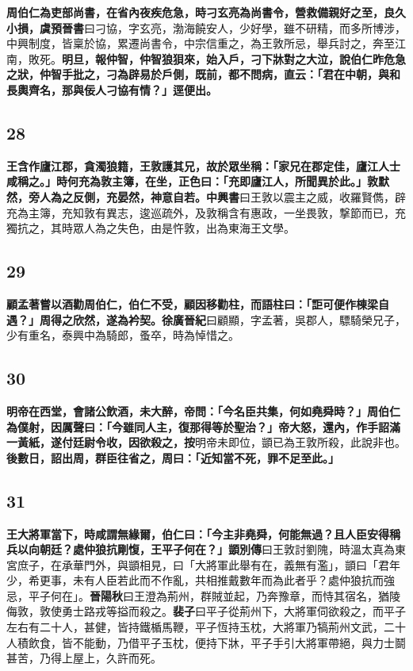 \textbf{周伯仁為吏部尚書，在省內夜疾危急，時刁玄亮為尚書令，營救備親好之至，良久小損，}{\footnotesize \textbf{虞預晉書}曰刁協，字玄亮，渤海饒安人，少好學，雖不研精，而多所博涉，中興制度，皆稟於協，累遷尚書令，中宗信重之，為王敦所忌，舉兵討之，奔至江南，敗死。}\textbf{明旦，報仲智，仲智狼狽來，始入戶，刁下牀對之大泣，說伯仁昨危急之狀，仲智手批之，刁為辟易於戶側，既前，都不問病，直云：「君在中朝，與和長輿齊名，那與佞人刁協有情？」逕便出。}

\subsection*{28}

\textbf{王含作廬江郡，貪濁狼籍，王敦護其兄，故於眾坐稱：「家兄在郡定佳，廬江人士咸稱之。」時何充為敦主簿，在坐，正色曰：「充即廬江人，所聞異於此。」敦默然，旁人為之反側，充晏然，神意自若。}{\footnotesize \textbf{中興書}曰王敦以震主之威，收羅賢儁，辟充為主簿，充知敦有異志，逡巡疏外，及敦稱含有惠政，一坐畏敦，撃節而已，充獨抗之，其時眾人為之失色，由是忤敦，出為東海王文學。}

\subsection*{29}

\textbf{顧孟著嘗以酒勸周伯仁，伯仁不受，顧因移勸柱，而語柱曰：「詎可便作棟梁自遇？」周得之欣然，遂為衿契。}{\footnotesize \textbf{徐廣晉紀}曰顧顯，字孟著，吳郡人，驃騎榮兄子，少有重名，泰興中為騎郎，蚤卒，時為悼惜之。}

\subsection*{30}

\textbf{明帝在西堂，會諸公飲酒，未大醉，帝問：「今名臣共集，何如堯舜時？」周伯仁為僕射，因厲聲曰：「今雖同人主，復那得等於聖治？」帝大怒，還內，作手詔滿一黃紙，遂付廷尉令收，因欲殺之，}{\footnotesize \textbf{按}明帝未即位，顗已為王敦所殺，此說非也。}\textbf{後數日，詔出周，群臣往省之，周曰：「近知當不死，罪不足至此。」}

\subsection*{31}

\textbf{王大將軍當下，時咸謂無緣爾，伯仁曰：「今主非堯舜，何能無過？且人臣安得稱兵以向朝廷？處仲狼抗剛愎，王平子何在？」}{\footnotesize \textbf{顗別傳}曰王敦討劉隗，時溫太真為東宮庶子，在承華門外，與顗相見，曰「大將軍此舉有在，義無有濫」，顗曰「君年少，希更事，未有人臣若此而不作亂，共相推戴數年而為此者乎？處仲狼抗而強忌，平子何在」。\textbf{晉陽秋}曰王澄為荊州，群賊並起，乃奔豫章，而恃其宿名，猶陵侮敦，敦使勇士路戎等搤而殺之。\textbf{裴子}曰平子從荊州下，大將軍伺欲殺之，而平子左右有二十人，甚健，皆持鐵楯馬鞭，平子恆持玉枕，大將軍乃犒荊州文武，二十人積飲食，皆不能動，乃借平子玉枕，便持下牀，平子手引大將軍帶絕，與力士鬬甚苦，乃得上屋上，久許而死。}

